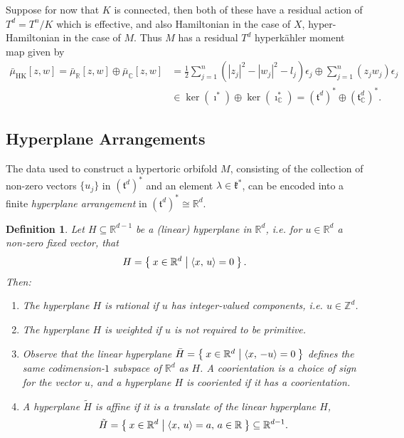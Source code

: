 \documentclass{article}
\newtheorem{defn}[theorem]{Definition\rm}
\newcommand{\ie}{\emph{i.e.} }
\newcommand{\e}{\epsilon}
\newcommand{\RR}{\mathbb{R}}
\newcommand{\CC}{\mathbb{C}}
\newcommand{\ZZ}{\mathbb{Z}}
\newcommand{\mfk}{\mathfrak{k}}
\newcommand{\mft}{\mathfrak{t}}
\newcommand{\half}{\frac{1}{2}}
\newcommand{\bmu}{\bar{\mu}}
\DeclareMathOperator{\HK}{HK}
\begin{document}
	Suppose for now that $K$ is connected, then both of these have a residual action of $T^{d} = T^{n}/K$ which is effective, and also Hamiltonian in the case of $X$, hyper-Hamiltonian in the case of $M$. Thus $M$ has a residual $T^{d}$ hyperk\"ahler moment map given by
	\begin{align}
		\bmu_{\HK}[z,w] = \bmu_{\RR}[z,w] \oplus \bmu_{\CC}[z,w] &= \half \sum_{j=1}^{n}(|z_{j}|^{2} - |w_{j}|^{2} - l_{j})\e_{j} \oplus \sum_{j=1}^{n}(z_{j}w_{j})\e_{j} \\
		&\in \ker(\imath^{\ast}) \oplus \ker(\imath_{\CC}^{\ast}) = (\mft^{d})^{\ast} \oplus (\mft_{\CC}^{d})^{\ast}.
	\end{align}

	\subsection{Hyperplane Arrangements}
	
	The data used to construct a hypertoric orbifold $M$, consisting of the collection of non-zero vectors $\{u_{j}\}$ in $(\mft^{d})^{\ast}$ and an element $\lambda \in \mfk^{\ast}$, can be encoded into a finite \emph{hyperplane arrangement} in $(\mft^{d})^{\ast} \cong \RR^{d}$. 
	
	\begin{defn}
		Let $H \subseteq \RR^{d-1}$ be a (linear) hyperplane in $\RR^{d}$, \ie for $u \in \RR^{d}$ a non-zero fixed vector, that
		\[
			H = \Set{x \in \RR^{d} | \langle x,\, u \rangle = 0 }.
		\]
		Then:
		\begin{enumerate}
			\item[(rational) --] The hyperplane $H$ is \emph{rational} if $u$ has integer-valued components, \ie $u \in \ZZ^{d}$.
			\item[(weighted) --] The hyperplane $H$ is \emph{weighted} if $u$ is not required to be primitive.
			\item[(cooriented) --] Observe that the linear hyperplane $\bar{H} = \Set{ x \in \RR^{d} | \langle x,\, -u \rangle = 0}$ defines the same codimension-$1$ subspace of $\RR^{d}$ as $H$.  A \emph{coorientation} is a choice of sign for the vector $u$, and a hyperplane $H$ is \emph{cooriented} if it has a coorientation.
			\item[(affine) --] A hyperplane $\tilde{H}$ is \emph{affine} if it is a translate of the linear hyperplane $H$,
			\[
				\tilde{H} = \Set{x \in \RR^{d} | \langle x,\, u \rangle = a,\, a \in \RR} \subseteq \RR^{d-1}.	
			\]
		\end{enumerate}
	\end{defn}
\end{document}
